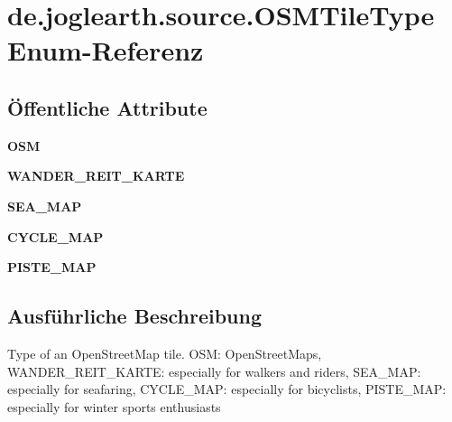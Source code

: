 \section{de.\-joglearth.\-source.\-O\-S\-M\-Tile\-Type Enum-\/\-Referenz}
\label{enumde_1_1joglearth_1_1source_1_1_o_s_m_tile_type}
\subsection*{Öffentliche Attribute}
\begin{DoxyCompactItemize}
\item 
{\bfseries O\-S\-M}\label{enumde_1_1joglearth_1_1source_1_1_o_s_m_tile_type_aacf367dadcfa86d07000e050157ae264}

\item 
{\bfseries W\-A\-N\-D\-E\-R\-\_\-\-R\-E\-I\-T\-\_\-\-K\-A\-R\-T\-E}\label{enumde_1_1joglearth_1_1source_1_1_o_s_m_tile_type_ae78e179d37c4796ca6047f115704a7b0}

\item 
{\bfseries S\-E\-A\-\_\-\-M\-A\-P}\label{enumde_1_1joglearth_1_1source_1_1_o_s_m_tile_type_a01f418a3c2d870dc7b2326fd1106412c}

\item 
{\bfseries C\-Y\-C\-L\-E\-\_\-\-M\-A\-P}\label{enumde_1_1joglearth_1_1source_1_1_o_s_m_tile_type_aff2af2413039c3821a05f160ebeebc62}

\item 
{\bfseries P\-I\-S\-T\-E\-\_\-\-M\-A\-P}\label{enumde_1_1joglearth_1_1source_1_1_o_s_m_tile_type_ab40d7662087f67a548fa7fc89c4ce7c7}

\end{DoxyCompactItemize}


\subsection{Ausführliche Beschreibung}
Type of an Open\-Street\-Map tile. O\-S\-M\-: Open\-Street\-Maps, W\-A\-N\-D\-E\-R\-\_\-\-R\-E\-I\-T\-\_\-\-K\-A\-R\-T\-E\-: especially for walkers and riders, S\-E\-A\-\_\-\-M\-A\-P\-: especially for seafaring, C\-Y\-C\-L\-E\-\_\-\-M\-A\-P\-: especially for bicyclists, P\-I\-S\-T\-E\-\_\-\-M\-A\-P\-: especially for winter sports enthusiasts 